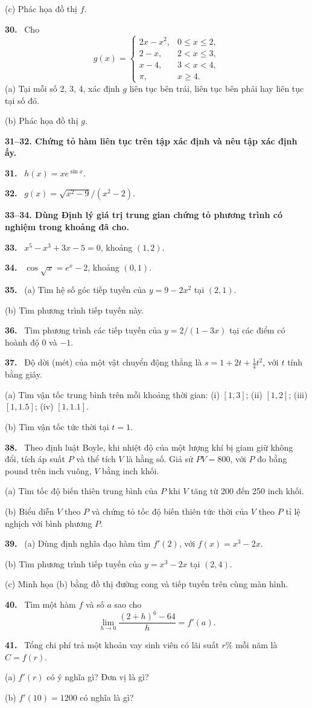 \documentclass[12pt,a4paper]{article}
\newcommand{\bt}[1]{\par\smallskip\noindent\textbf{#1.}\ }
\newcommand{\group}[1]{\par\medskip\noindent\textbf{#1}\par\nopagebreak[4]}
\begin{document}
(c) Phác họa đồ thị $f$.
\bt{30} Cho
\[g(x)=\begin{cases}2x-x^2,&0\le x\le2,\\2-x,&2<x\le3,\\x-4,&3<x<4,\\\pi,&x\ge4.\end{cases}\]
(a) Tại mỗi số 2, 3, 4, xác định $g$ liên tục bên trái, liên tục bên phải hay liên tục tại số đó.

(b) Phác họa đồ thị $g$.
\group{31–32. Chứng tỏ hàm liên tục trên tập xác định và nêu tập xác định ấy.}
\bt{31} $h(x)=xe^{\sin x}$.
\bt{32} $g(x)=\sqrt{x^2-9}/(x^2-2)$.
\group{33–34. Dùng Định lý giá trị trung gian chứng tỏ phương trình có nghiệm trong khoảng đã cho.}
\bt{33} $x^5-x^3+3x-5=0$, khoảng $(1,2)$.
\bt{34} $\cos\sqrt{x}=e^x-2$, khoảng $(0,1)$.
\bt{35} (a) Tìm hệ số góc tiếp tuyến của $y=9-2x^2$ tại $(2,1)$.

(b) Tìm phương trình tiếp tuyến này.
\bt{36} Tìm phương trình các tiếp tuyến của $y=2/(1-3x)$ tại các điểm có hoành độ 0 và $-1$.
\bt{37} Độ dời (mét) của một vật chuyển động thẳng là $s=1+2t+\frac14t^2$, với $t$ tính bằng giây.

(a) Tìm vận tốc trung bình trên mỗi khoảng thời gian: (i) $[1,3]$; (ii) $[1,2]$; (iii) $[1,1.5]$; (iv) $[1,1.1]$.

(b) Tìm vận tốc tức thời tại $t=1$.
\bt{38} Theo định luật Boyle, khi nhiệt độ của một lượng khí bị giam giữ không đổi, tích áp suất $P$ và thể tích $V$ là hằng số. Giả sử $PV=800$, với $P$ đo bằng pound trên inch vuông, $V$ bằng inch khối.

(a) Tìm tốc độ biến thiên trung bình của $P$ khi $V$ tăng từ 200 đến 250 inch khối.

(b) Biểu diễn $V$ theo $P$ và chứng tỏ tốc độ biến thiên tức thời của $V$ theo $P$ tỉ lệ nghịch với bình phương $P$.
\bt{39} (a) Dùng định nghĩa đạo hàm tìm $f'(2)$, với $f(x)=x^3-2x$.

(b) Tìm phương trình tiếp tuyến của $y=x^3-2x$ tại $(2,4)$.

(c) Minh họa (b) bằng đồ thị đường cong và tiếp tuyến trên cùng màn hình.
\bt{40} Tìm một hàm $f$ và số $a$ sao cho
\[\lim_{h\to0}\frac{(2+h)^6-64}h=f'(a).\]
\bt{41} Tổng chi phí trả một khoản vay sinh viên có lãi suất $r\%$ mỗi năm là $C=f(r)$.

(a) $f'(r)$ có ý nghĩa gì? Đơn vị là gì?

(b) $f'(10)=1200$ có nghĩa là gì?
\end{document}
